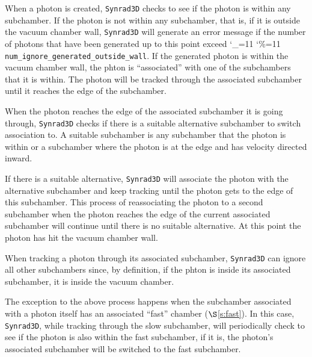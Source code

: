 \documentclass[11pt,openany]{report}
\newcommand{\sref}[1]{$\S$\ref{#1}}
\newcommand{\srthree}{\texttt{Synrad3D}\xspace}
\newcommand\ttcmd{\begingroup\catcode`\_=11 \catcode`\%=11 \dottcmd}
\newcommand\dottcmd[1]{\texttt{#1}\endgroup}
\newcommand{\vn}{\ttcmd}
\begin{document}
When a photon is created, \srthree checks to see if the photon is within any
subchamber. If the photon is not within any subchamber, that is, if it is outside the
vacuum chamber wall, \srthree will generate an error message if the number of photons that
have been generated up to this point exceed \vn{num_ignore_generated_outside_wall}. If
the generated photon is within the vacuum chamber wall, the phton is ``associated'' with
one of the subchambers that it is within.  The photon will be tracked through the
associated subchamber until it reaches the edge of the subchamber.

When the photon reaches the edge of the associated subchamber it is going through,
\srthree checks if there is a suitable alternative subchamber to switch association to. A
suitable subchamber is any subchamber that the photon is within or a subchamber where the
photon is at the edge and has velocity directed inward.

If there is a suitable alternative, \srthree will associate the photon with the
alternative subchamber and keep tracking until the photon gets to the edge of this
subchamber.  This process of reassociating the photon to a second subchamber when the
photon reaches the edge of the current associated subchamber will continue until there is
no suitable alternative. At this point the photon has hit the vacuum chamber wall.

When tracking a photon through its associated subchamber, \srthree can ignore all other
subchambers since, by definition, if the phton is inside its associated subchamber, it
is inside the vacuum chamber.

The exception to the above process happens when the subchamber associated with a photon
itself has an associated ``fast'' chamber (\sref{s:fast}). In this case, \srthree, while
tracking through the slow subchamber, will periodically check to see if the photon is also
within the fast subchamber, if it is, the photon's associated subchamber will be switched
to the fast subchamber.
\end{document}
